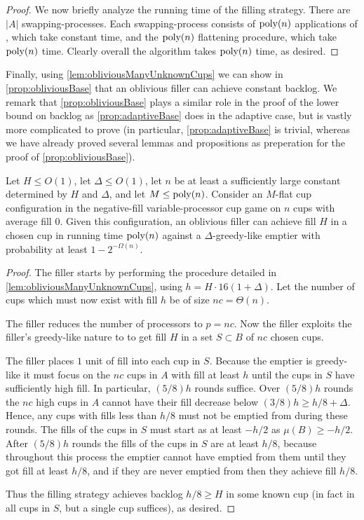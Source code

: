 \begin{proof}
We now briefly analyze the running time of the filling strategy.
There are $|A|$ swapping-processes. Each swapping-process
consists of $\operatorname{\text{poly}}(n)$ applications of \randalg, which take
constant time, and the $\operatorname{\text{poly}}(n)$ flattening procedure, which
take $\operatorname{\text{poly}}(n)$ time. Clearly overall the algorithm takes
$\operatorname{\text{poly}}(n)$ time, as desired.
  
\end{proof}

Finally, using \cref{lem:obliviousManyUnknownCups} we can show in
\cref{prop:obliviousBase} that an oblivious filler can achieve
constant backlog. We remark that \cref{prop:obliviousBase} plays a
similar role in the proof of the lower bound on backlog as
\cref{prop:adaptiveBase} does in the adaptive case, but is vastly
more complicated to prove (in particular,
\cref{prop:adaptiveBase} is trivial, whereas we have already
proved several lemmas and propositions as preperation for the
proof of \cref{prop:obliviousBase}).
\begin{proposition}
  \label{prop:obliviousBase}
  Let $H \le O(1)$, let $\Delta \le O(1)$, let $n$ be at
  least a sufficiently large constant determined by $H$ and
  $\Delta$, and let $M \le \operatorname{\text{poly}}(n)$. 
  Consider an $M$-flat cup configuration in the negative-fill variable-processor cup
  game on $n$ cups with average fill $0$.
  Given this configuration, an oblivious filler can achieve fill $H$
  in a chosen cup in running time $\operatorname{\text{poly}}(n)$ against a
  $\Delta$-greedy-like emptier with probability at least $1-2^{-\Omega(n)}.$
\end{proposition}
\begin{proof}
  The filler starts by performing the procedure detailed in
  \cref{lem:obliviousManyUnknownCups}, using $h = H\cdot
  16(1+\Delta)$. Let the number of cups which must now exist with
  fill $h$ be of size $nc = \Theta(n)$.

  The filler reduces the number of processors to $p=nc$. 
  Now the filler exploits the filler's greedy-like nature to
  to get fill $H$ in a set $S\subset B$ of $nc$ chosen cups.

  The filler places $1$ unit of fill into each cup in $S$.
  Because the emptier is greedy-like it must focus on the $nc$
  cups in $A$ with fill at least $h$ until the cups in $S$ have
  sufficiently high fill. In particular, $(5/8)h$ rounds suffice.
  Over $(5/8)h$ rounds the $nc$ high cups in $A$ cannot have
  their fill decrease below $(3/8)h \ge h/8 + \Delta$. Hence, any
  cups with fills less than $h/8$ must not be emptied from during
  these rounds. The fills of the cups in $S$ must start as at
  least $-h/2$ as $\mu(B) \ge -h/2$. After $(5/8)h$ rounds the
  fills of the cups in $S$ are at least $h/8$, because throughout
  this process the emptier cannot have emptied from them until
  they got fill at least $h/8$, and if they are never emptied
  from then they achieve fill $h/8$.

  Thus the filling strategy achieves backlog $h/8 \ge H$ in some
  known cup (in fact in all cups in $S$, but a single cup
  suffices), as desired.

\end{proof}

